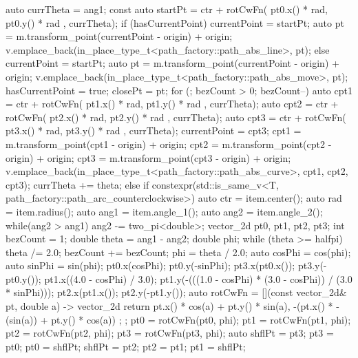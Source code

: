 \begin{codeblock}
{{{        auto currTheta = ang1;
        const auto startPt =
        ctr + rotCwFn({ pt0.x() * rad, pt0.y() * rad }, currTheta);
        if (hasCurrentPoint) {
          currentPoint = startPt;
          auto pt = m.transform_point(currentPoint - origin) + origin;
          v.emplace_back(in_place_type_t<path_factory::path_abs_line>, pt);
        }
        else {
          currentPoint = startPt;
          auto pt = m.transform_point(currentPoint - origin) + origin;
          v.emplace_back(in_place_type_t<path_factory::path_abs_move>, pt);
          hasCurrentPoint = true;
          closePt = pt;
        }
        for (; bezCount > 0; bezCount--) {
          auto cpt1 = ctr + rotCwFn({ pt1.x() * rad, pt1.y() * rad }, currTheta);
          auto cpt2 = ctr + rotCwFn({ pt2.x() * rad, pt2.y() * rad },
            currTheta);
          auto cpt3 = ctr + rotCwFn({ pt3.x() * rad, pt3.y() * rad },
            currTheta);
          currentPoint = cpt3;
          cpt1 = m.transform_point(cpt1 - origin) + origin;
          cpt2 = m.transform_point(cpt2 - origin) + origin;
          cpt3 = m.transform_point(cpt3 - origin) + origin;
          v.emplace_back(in_place_type_t<path_factory::path_abs_curve>, cpt1,
            cpt2, cpt3);
          currTheta += theta;
        }
      }
      else if constexpr(std::is_same_v<T, path_factory::path_arc_counterclockwise>) {
      {
        auto ctr = item.center();
        auto rad = item.radius();
        auto ang1 = item.angle_1();
        auto ang2 = item.angle_2();
        while(ang2 > ang1) {
          ang2 -= two_pi<double>;
        }
        vector_2d pt0, pt1, pt2, pt3;
        int bezCount = 1;
        double theta = ang1 - ang2;
        double phi;
        while (theta >= halfpi) {
          theta /= 2.0;
          bezCount += bezCount;
        }
        phi = theta / 2.0;
        auto cosPhi = cos(phi);
        auto sinPhi = sin(phi);
        pt0.x(cosPhi);
        pt0.y(-sinPhi);
        pt3.x(pt0.x());
        pt3.y(-pt0.y());
        pt1.x((4.0 - cosPhi) / 3.0);
        pt1.y(-(((1.0 - cosPhi) * (3.0 - cosPhi)) / (3.0 * sinPhi)));
        pt2.x(pt1.x());
        pt2.y(-pt1.y());
        auto rotCwFn = [](const vector_2d& pt, double a) -> vector_2d {
          return { pt.x() * cos(a) + pt.y() * sin(a),
            -(pt.x() * -(sin(a)) + pt.y() * cos(a)) };
        };
        pt0 = rotCwFn(pt0, phi);
        pt1 = rotCwFn(pt1, phi);
        pt2 = rotCwFn(pt2, phi);
        pt3 = rotCwFn(pt3, phi);
        auto shflPt = pt3;
        pt3 = pt0;
        pt0 = shflPt;
        shflPt = pt2;
        pt2 = pt1;
        pt1 = shflPt;
}}}}
\end{codeblock}
